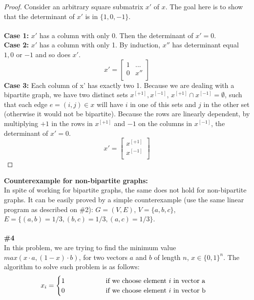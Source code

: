 \documentclass{article}
\newcommand\tab[1][1cm]{\hspace*{#1}}
\begin{document}
\begin{proof}
Consider an arbitrary square submatrix $x'$ of $x$. The goal here is to show that the determinant of $x'$ is in $\{ 1, 0, -1\}$.
\\
\\
\textbf{Case 1:} $x'$ has a column with only 0. Then the determinant of $x' = 0$.
\\
\textbf{Case 2:} $x'$ has a column with only 1. By induction, $x''$ has determinant equal $1, 0$ or $-1$ and so does $x'$.
\[
x' =
\begin{bmatrix}
    1       & ... \\
    0      & x'' \\
\end{bmatrix}
\]
\textbf{Case 3:} Each column of x' has exactly two 1. Because we are dealing with a bipartite graph, we have two distinct sets $x^{[+1]}, x^{[-1]}$, $x^{[+1]} \cap x^{[-1]} = \emptyset$, such that each edge $e=(i,j) \in x$ will have $i$ in one of this sets and $j$ in the other set (otherwise it would not be bipartite). Because the rows are linearly dependent, by multiplying $+1$ in the rows in $x^{[+1]}$ and $-1$ on the columns in $x^{[-1]}$, the determinant of $x' = 0$.
\[
x' =
\begin{bmatrix}
    x^{[+1]}\\
    x^{[-1]}\\
\end{bmatrix}
\]
\end{proof}
\textbf{Counterexample for non-bipartite graphs:}
\\
In spite of working for bipartite graphs, the same does not hold for non-bipartite graphs. It can be easily proved by a simple counterexample (use the same linear program as described on \#2): $G=(V,E)$, $V=\{a, b, c\}$, $E=\{(a,b) = 1/3, (b, c) = 1/3, (a,c) = 1/3\}$.
\\
\\
\textbf{\#4}
\\
In this problem, we are trying to find the minimum value $max(x \cdot a, (1-x) \cdot b)$, for two vectors $a$ and $b$ of length $n$, $x \in \{0, 1\}^n$. The algorithm to solve such problem is as follows:
\begin{gather*}
x_i =
\begin{cases}
1 \tab\tab\text{ if we choose element $i$ in vector a}\\
0 \tab\tab\text{ if we choose element $i$ in vector b}\\
\end{cases}
\end{gather*}
\end{document}
